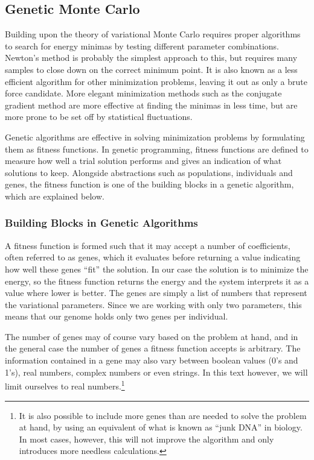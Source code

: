 \documentclass[aps,prb,twocolumn,floatfix]{revtex4}
\begin{document}

\subsection{Genetic Monte Carlo} \label{sec:genetic}

Building upon the theory of variational Monte Carlo requires proper algorithms to search for energy minimas by testing different parameter combinations. Newton's method is probably the simplest approach to this, but requires many samples to close down on the correct minimum point. It is also known as a less efficient algorithm for other minimization problems, leaving it out as only a brute force candidate. More elegant minimization methods such as the conjugate gradient method are more effective at finding the minimas in less time, but are more prone to be set off by statistical fluctuations.

Genetic algorithms are effective in solving minimization problems by formulating them as fitness functions. In genetic programming, fitness functions are defined to measure how well a trial solution performs and gives an indication of what solutions to keep. Alongside abstractions such as populations, individuals and genes, the fitness function is one of the building blocks in a genetic algorithm, which are explained below.

\subsubsection{Building Blocks in Genetic Algorithms}

A fitness function is formed such that it may accept a number of coefficients, often referred to as genes, which it evaluates before returning a value indicating how well these genes ``fit'' the solution. In our case the solution is to minimize the energy, so the fitness function returns the energy and the system interprets it as a value where lower is better. The genes are simply a list of numbers that represent the variational parameters. Since we are working with only two parameters, this means that our genome holds only two genes per individual.

The number of genes may of course vary based on the problem at hand, and in the general case the number of genes a fitness function accepts is arbitrary. The information contained in a gene may also vary between boolean values (0's and 1's), real numbers, complex numbers or even strings. In this text however, we will limit ourselves to real numbers.\footnote{It is also possible to include more genes than are needed to solve the problem at hand, by using an equivalent of what is known as ``junk DNA'' in biology. In most cases, however, this will not improve the algorithm and only introduces more needless calculations.}
\end{document}
